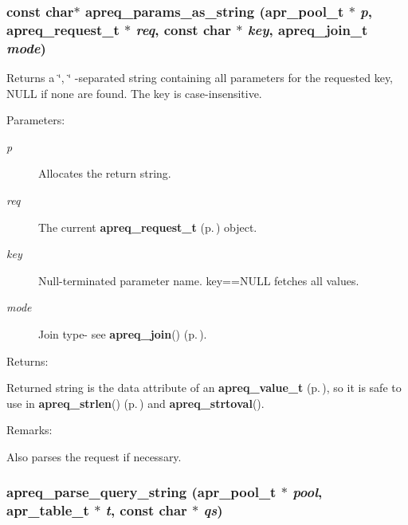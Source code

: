 \subsubsection{\setlength{\rightskip}{0pt plus 5cm}const char$\ast$ apreq\_\-params\_\-as\_\-string ({\bf apr\_\-pool\_\-t} $\ast$ {\em p}, {\bf apreq\_\-request\_\-t} $\ast$ {\em req}, const char $\ast$ {\em key}, {\bf apreq\_\-join\_\-t} {\em mode})}\label{group__params_a9}


Returns a \char`\"{}, \char`\"{} -separated string containing all parameters  for the requested key, NULL if none are found. The key is case-insensitive. \begin{Desc}
\item[Parameters: ]\par
\begin{description}
\item[{\em 
p}]Allocates the return string. \item[{\em 
req}]The current {\bf apreq\_\-request\_\-t} {\rm (p.\,\pageref{structapreq__request__t})} object. \item[{\em 
key}]Null-terminated parameter name. key==NULL fetches all values.  \item[{\em 
mode}]Join type- see {\bf apreq\_\-join}() {\rm (p.\,\pageref{group__Utils_a7})}. \end{description}
\end{Desc}
\begin{Desc}
\item[Returns: ]\par
Returned string is the data attribute of an {\bf apreq\_\-value\_\-t} {\rm (p.\,\pageref{structapreq__value__t})}, so it is safe to use in {\bf apreq\_\-strlen}() {\rm (p.\,\pageref{group__Utils_a35})} and {\bf apreq\_\-strtoval}(). \end{Desc}
\begin{Desc}
\item[Remarks: ]\par
Also parses the request if necessary. \end{Desc}
\subsubsection{ apreq\_\-parse\_\-query\_\-string ({\bf apr\_\-pool\_\-t} $\ast$ {\em pool}, {\bf apr\_\-table\_\-t} $\ast$ {\em t}, const char $\ast$ {\em qs})}\label{group__params_a12}


